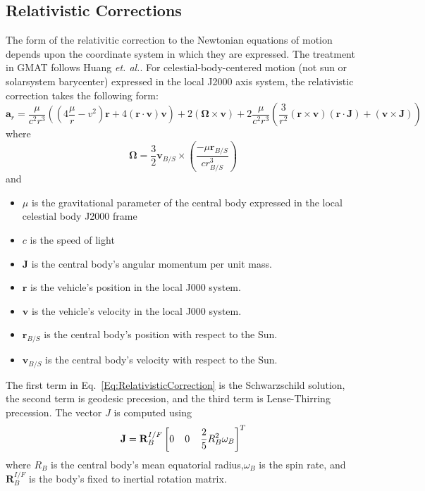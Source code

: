 \subsection{Relativistic Corrections}

The form of the relativitic correction to the Newtonian equations of motion depends upon the coordinate system in which they are expressed.  The treatment in GMAT follows Huang\cite{Huang:90} \emph{et. al.}. For celestial-body-centered motion (not sun or solarsystem barycenter) expressed in the local J2000 axis system, the relativistic correction takes the following form:
%
\begin{equation}
    \mathbf{a}_r = \frac{\mu}{c^2 r^3}\left(  \left( 4\frac{\mu}{r} - v^2\right)\mathbf{r} +   4(\mathbf{r}\cdot\mathbf{v})\mathbf{v}\right) + 2 (\boldsymbol{\Omega} \times \mathbf{v}) + 2 \frac{\mu}{c^2 r^3}
    \left( \frac{3}{r^2}(\mathbf{r} \times \mathbf{v})(\mathbf{r} \cdot \mathbf{J}) +(\mathbf{v}\times\mathbf{J}) \right)
    \label{Eq:RelativisticCorrection}
\end{equation}
%
where
%
\begin{equation}
   \boldsymbol{\Omega} = \frac{3}{2} \mathbf{v}_{B/S} \times \left( \frac{-\mu \mathbf{r}_{B/S}}{cr_{B/S}^3} \right)
\end{equation}
%
and
%
\begin{itemize}
   \item  $\mu$ is the gravitational parameter of the central body expressed in the local celestial body J2000 frame
   \item  $c$ is the speed of light
   \item  $\mathbf{J}$ is the central body's angular momentum per unit mass.
   \item  $\mathbf{r}$ is the vehicle's position in the local J000 system.
   \item  $\mathbf{v}$ is the vehicle's velocity in the local J000 system.
   \item  $\mathbf{r}_{B/S}$ is the central body's position with respect to the Sun.
   \item  $\mathbf{v}_{B/S}$ is the central body's velocity with respect to the Sun.
\end{itemize}
%
The first term in Eq.~\ref{Eq:RelativisticCorrection} is the Schwarzschild solution, the second term is geodesic precesion, and the third term is Lense-Thirring precession.  The vector $J$ is computed using
%
\begin{equation}
    \mathbf{J} = \mathbf{R}_B^{I/F}\left[ 0   \hspace{0.15 in} 0  \hspace{0.15 in}   \frac{2}{5}R_B^2 \omega_B \right]^T
\end{equation}
%
where $R_B$ is the central body's mean equatorial radius,$\omega_B$ is the spin rate, and $\mathbf{R}_B^{I/F}$ is the
body's fixed to inertial rotation matrix.

